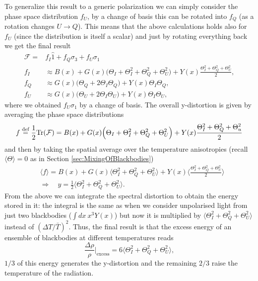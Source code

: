 To generalize this result to a generic polarization we can simply consider the phase space distribution $f_U$, by a change of basis this can be rotated into $f_Q$ (as a rotation changes $U\rightarrow Q$). This means that the above calculations holds also for $f_U$ (since the distribution is itself a scalar) and just by rotating everything back we get the final result
\begin{subequations}\label{eq:y-dist_polarization_components}
\begin{align}
    \mathcal{F}=&f_I\hat 1+f_Q\sigma_3+f_U\sigma_1 \\
    f_I&\approx B(x)+G(x)\Big(\Theta_I+\Theta^2_I+\Theta^2_Q+\Theta^2_U\Big)+Y(x)\frac{\Theta^2_I+\Theta^2_Q+\Theta^2_U}{2},\\
    f_Q&\approx G(x)\Big(\Theta_Q+2\Theta_I\Theta_Q\Big)+Y(x)\Theta_I\Theta_Q,\\
    f_U&\approx G(x)\Big(\Theta_U+2\Theta_I\Theta_U\Big)+Y(x)\Theta_I\Theta_U,
\end{align}
\end{subequations}
where we obtained $f_U\sigma_1$ by a change of basis.
The overall y-distortion is given by averaging the phase space distributions 
$$ f\stackrel{\text{def}}{=}\frac{1}{2}\text{Tr}(\mathcal{F} )= B(x)+G(x)\Big(\Theta_I+\Theta^2_I+\Theta^2_Q+\Theta^2_U\Big)+Y(x)\frac{\Theta^2_I+\Theta^2_Q+\Theta^2_u}{2}$$
and then by taking the spatial average over the temperature anisotropies (recall $\langle\Theta\rangle=0$ as in Section \ref{sec:MixingOfBlackbodies}) 
\begin{align}
    &\langle f\rangle=B(x)+G(x)\Big\langle \Theta^2_I+\Theta^2_Q+\Theta^2_U\Big\rangle+Y(x)\Bigg\langle\frac{\Theta^2_I+\Theta^2_Q+\Theta^2_U}{2}\Bigg\rangle\nonumber\\
    &\Longrightarrow\quad \boxed{y=\frac{1}{2}\Big\langle\Theta^2_I+\Theta^2_Q+\Theta^2_U\Big\rangle}.\label{eq:y-distortion_polarization}
\end{align}
From the above we can integrate the spectral distortion to obtain the energy stored in it: the integral is the same as when we consider unpolarised light from just two blackbodies ($\int dx\ x^3 Y(x)$) but now it is multiplied by $\big\langle\Theta^2_I+\Theta^2_Q+\Theta^2_U\big\rangle$ instead of $(\Delta T/\bar T)^2$. Thus, the final result is that the excess energy of an ensemble of blackbodies at different temperatures reads 
\begin{equation}
    \frac{\Delta \rho}{\rho}\bigg|_\text{excess}=6\Big\langle\Theta^2_I+\Theta^2_Q+\Theta^2_U\Big\rangle,\label{eq:polarize_mixing_excess_energy}
\end{equation}
$1/3$ of this energy generates the y-distortion and the remaining $2/3$ raise the temperature of the radiation.

